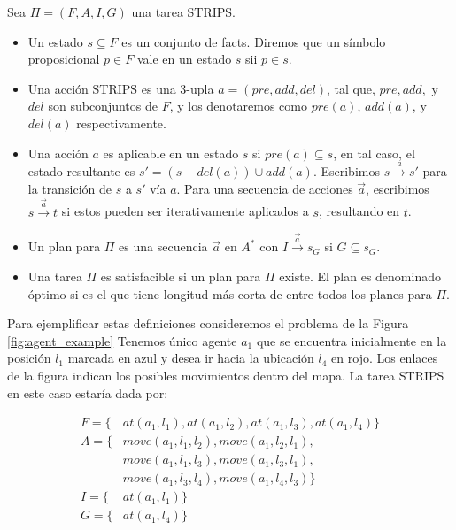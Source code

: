 \begin{mydef}
    Sea $\Pi = (F, A, I, G)$ una tarea STRIPS.
    
    \begin{itemize}
        \item Un estado $s \subseteq F$ es un conjunto de facts. Diremos que un
        símbolo proposicional $p \in F$ vale en un estado $s$ sii $p \in s$.
        
        \item Una acción STRIPS es una 3-upla $a = (pre, add, del)$, tal que,
        $pre, add,$ y $del$ son subconjuntos de $F$, y los denotaremos como $pre(a)$,
        $add(a)$, y $del(a)$ respectivamente.

        \item Una acción $a$ es aplicable en un estado $s$ si $pre(a) \subseteq
        s$, en tal caso, el estado resultante es $s' = (s - del(a)) \cup
        add(a)$. Escribimos $s \xrightarrow{a} s'$ para la transición de $s$ a
        $s'$ vía $a$. Para una secuencia de acciones $\vec{a}$, escribimos $s
        \xrightarrow{\vec{a}} t$ si estos pueden ser iterativamente aplicados a
        $s$, resultando en $t$.

        \item Un plan para $\Pi$ es una secuencia $\vec{a}$ en $A^{*}$ con $I
        \xrightarrow{\vec{a}} s_G$ si $G \subseteq s_G$.
        
        \item Una tarea $\Pi$ es satisfacible si un plan para $\Pi$ existe. El
        plan es denominado óptimo si es el que tiene longitud más corta de entre
        todos los planes para $\Pi$.
    \end{itemize}
\end{mydef}

Para ejemplificar estas definiciones consideremos el problema de la Figura
\ref{fig:agent_example} Tenemos único agente $a_1$ que se encuentra inicialmente
en la posición $l_1$ marcada en azul y desea ir hacia la ubicación $l_4$ en
rojo. Los enlaces de la figura indican los posibles movimientos dentro del mapa.
La tarea STRIPS en este caso estaría dada por:

\begin{align*}
    F = \{&at(a_1, l_1), at(a_1, l_2), at(a_1, l_3), at(a_1, l_4)\} \\
    A = \{&move(a_1, l_1, l_2), move(a_1, l_2, l_1), \\
    & move(a_1, l_1, l_3), move(a_1, l_3, l_1),\\
    & move(a_1, l_3, l_4), move(a_1, l_4, l_3)\} \\
    I = \{&at(a_1, l_1)\} \\
    G = \{&at(a_1, l_4)\}
\end{align*}

